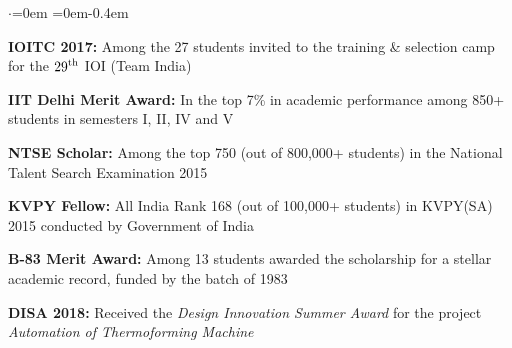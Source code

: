 \documentclass[letterpaper,10pt]{resume}
\newcommand{\resumeItem }[2]{
  \item\small{
    \textbf{#1}{: #2 \vspace{-4.5pt}}
  }
}
\newcommand{\resumeSubItem}[2]{\resumeItem{#1}{#2}\vspace{0pt}}
\newcommand{\resumeSubHeadingListStart}{\begin{itemize}[leftmargin=*]}
\begin{document}
\begin{list}{$\cdot$}{\leftmargin=0em \rightmargin=0em}\itemsep -0.4em \vspace{-0.6em}
    \item \textbf{IOITC 2017:} Among the 27 students invited to the training \& selection camp for the ${29}^{\textnormal{th}}$ IOI (Team India)
    \item \textbf{IIT Delhi Merit Award:} In the top 7\% in academic performance among 850+ students in semesters I, II, IV and V
    \item \textbf{NTSE Scholar:} Among the top 750 (out of 800,000+ students) in the National Talent Search Examination 2015
    \item \textbf{KVPY Fellow:} All India Rank 168 (out of 100,000+ students) in KVPY(SA) 2015 conducted by Government of India
    \item \textbf{B-83 Merit Award:} Among 13 students awarded the scholarship for a stellar academic record, funded by the batch of 1983
    \item \textbf{DISA 2018:} Received the \textit{Design Innovation Summer Award} for the project \textit{Automation of Thermoforming Machine}
\end{list}{}
  
  
    
\end{document}
